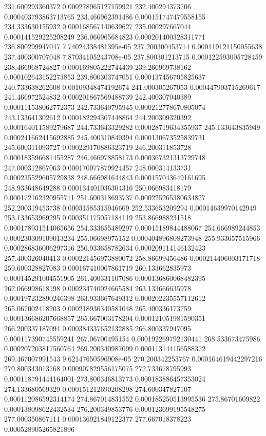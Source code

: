 {231.600293360372 0.000278965127159921
232.400294373706 0.000403793863713765
233.466962391486 0.000151747479558155
234.333630155932 0.000168567140639627
235.000297667044 0.000141529225208249
236.066965684823 0.000201400328311771
236.800299947047 7.74024338481395e-05
237.200300453714 0.000119121150055638
237.400300707048 7.87034105243708e-05
237.800301213715 0.000122593005728459
238.466968724827 0.000169805222744439
239.266969738162 0.000102643152273853
239.800303747051 0.000137456705825637
240.733638262608 0.00109348474192674
241.000305267053 0.000447903715269617
241.466972524832 0.000201867569488739
242.400307040389 0.000111538062772373
242.733640795945 0.000212778670805074
243.133641302612 0.000182294307448864
244.200309320392 0.000164011589279687
244.733643329282 0.00028719634355937
245.133643835949 0.000241662415692885
245.400310840394 0.000130673525839731
245.600311093727 0.000229170886323719
246.200311853728 0.000183596681455287
246.466978858173 0.000367321313729748
247.000312867063 0.000170077879924457
248.000314133731 0.000235529605729838
248.666981644843 0.000157043649161695
248.933648649288 0.000134401036304316
250.066983418179 0.000172162320955711
251.600318693737 0.000225265380634827
252.200319453738 0.00031585315946609
252.533653209294 0.00014639970142949
253.133653969295 0.000351175057184119
253.866988231518 0.000178931514065656
254.333655489297 0.00015189844488067
254.666989244853 0.000230309109013234
255.06698975152 0.000404896808273948
255.933657515966 0.000286836006297316
256.933658782634 0.000209114146132423
257.400326040413 0.000221456973880072
258.86699456486 0.000214406003171718
259.600328827083 0.000167410067861719
260.133662835973 0.000145291004551905
261.400331107086 0.000136860068482395
262.066998618198 0.000234740024665584
263.133666635978 0.000197232890246398
263.933667649312 0.000202235557112612
265.067002418203 0.000218930340581048
265.400336173759 0.000136686207668857
265.667003178204 0.000121051981590351
266.200337187094 0.000384337652132885
266.800337947095 0.000117390745559241
267.06700495154 0.000192269792130441
268.533673475986 0.000207203817560764
269.200340987099 0.000113144156588372
269.467007991543 9.62147650596908e-05
270.200342253767 0.000164619442297216
270.800343013768 0.000907829556175075
272.733678795993 0.000118791444164001
273.800346813773 0.000183886457353024
274.133680569329 0.000151212690208298
274.600347827107 0.000112086592314174
274.867014831552 0.000185250513995536
275.86701609822 0.000138098622432534
276.200349853776 0.000123699195548275
277.000350867111 0.000136921849122377
277.667018378223 0.000528905265821896
}
